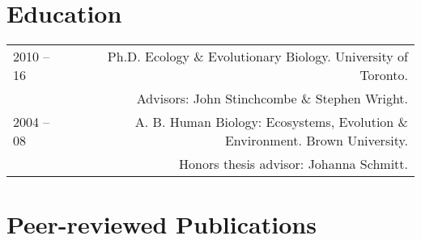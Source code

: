 \documentclass[letterpaper]{article}
\begin{document}
\section*{Education}
\begin{tabular}{LR}
2010 -- 16 & Ph.D. Ecology \& Evolutionary Biology. University of Toronto. \\ 
 & Advisors: John Stinchcombe \& Stephen Wright. \\ [0.5ex]
2004 -- 08 & A. B. Human Biology: Ecosystems, Evolution \& Environment. Brown University. \\
& Honors thesis advisor: Johanna Schmitt.
\end{tabular}


\section*{Peer-reviewed Publications}
\end{document}
